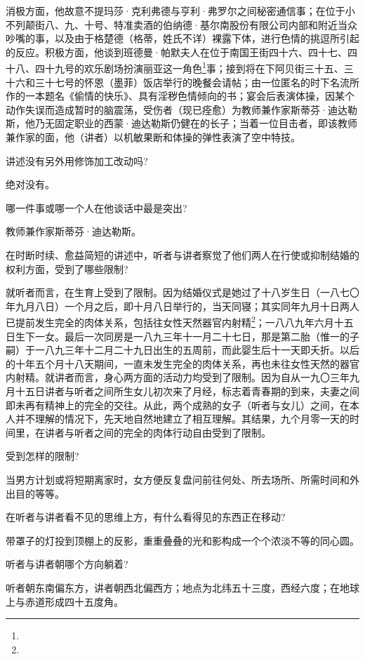 \par 消极方面，他故意不提玛莎·克利弗德与亨利·弗罗尔之间秘密通信事；在位于小不列颠街八、九、十号、特准卖酒的伯纳德·基尔南股份有限公司内部和附近当众吵嘴的事，以及由于格楚德（格蒂，姓氏不详）裸露下体，进行色情的挑逗所引起的反应。积极方面，他谈到班德曼·帕默夫人在位于南国王街四十六、四十七、四十八、四十九号的欢乐剧场扮演丽亚这一角色\footnote{}事；接到将在下阿贝街三十五、三十六和三十七号的怀恩（墨菲）饭店举行的晚餐会请帖；由一位匿名的时下名流所作的一本题名《偷情的快乐》、具有淫秽色情倾向的书；宴会后表演体操，因某个动作失误而造成暂时的脑震荡，受伤者（现已痊愈）为教师兼作家斯蒂芬·迪达勒斯，他乃无固定职业的西蒙·迪达勒斯仍健在的长子；当着一位目击者，即该教师兼作家的面，他（讲者）以机敏果断和体操的弹性表演了空中特技。
\par 讲述没有另外用修饰加工改动吗?
\par 绝对没有。
\par 哪一件事或哪一个人在他谈话中最是突出?
\par 教师兼作家斯蒂芬·迪达勒斯。
\par 在时断时续、愈益简短的讲述中，听者与讲者察觉了他们两人在行使或抑制结婚的权利方面，受到了哪些限制?
\par 就听者而言，在生育上受到了限制。因为结婚仪式是她过了十八岁生日（一八七〇年九月八日）一个月之后，即十月八日举行的，当天同寝；其实同年九月十日两人已提前发生完全的肉体关系，包括往女性天然器官内射精\footnote{}；一八八九年六月十五日生下一女。最后一次同房是一八九三年十一月二十七日，那是第二胎（惟一的子嗣）于一八九三年十二月二十九日出生的五周前，而此婴生后十一天即夭折。以后的十年五个月十八天期间，一直未发生完全的肉体关系，再也未往女性天然的器官内射精。就讲者而言，身心两方面的活动力均受到了限制。因为自从一九〇三年九月十五日讲者与听者之间所生女儿初次来了月经，标志着青春期的到来，夫妻之间即未再有精神上的完全的交往。从此，两个成熟的女子（听者与女儿）之间，在本人并不理解的情况下，先天地自然地建立了相互理解。其结果，九个月零一天的时间里，在讲者与听者之间的完全的肉体行动自由受到了限制。
\par 受到怎样的限制?
\par 当男方计划或将短期离家时，女方便反复盘问前往何处、所去场所、所需时间和外出目的等等。
\par 在听者与讲者看不见的思维上方，有什么看得见的东西正在移动?
\par 带罩子的灯投到顶棚上的反影，重重叠叠的光和影构成一个个浓淡不等的同心圆。
\par 听者与讲者朝哪个方向躺着?
\par 听者朝东南偏东方，讲者朝西北偏西方；地点为北纬五十三度，西经六度；在地球上与赤道形成四十五度角。
